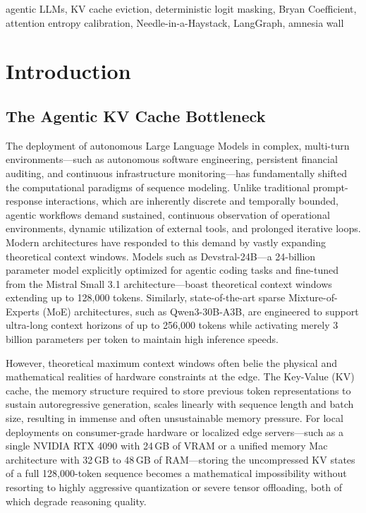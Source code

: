 \documentclass[11pt,a4paper]{article}
\begin{document}
\begin{keywords}
agentic LLMs, KV cache eviction, deterministic logit masking, Bryan Coefficient, attention entropy calibration, Needle-in-a-Haystack, LangGraph, amnesia wall
\end{keywords}

\section{Introduction}

\subsection{The Agentic KV Cache Bottleneck}
The deployment of autonomous Large Language Models in complex, multi-turn environments---such as autonomous software engineering, persistent financial auditing, and continuous infrastructure monitoring---has fundamentally shifted the computational paradigms of sequence modeling.\cite{1} Unlike traditional prompt-response interactions, which are inherently discrete and temporally bounded, agentic workflows demand sustained, continuous observation of operational environments, dynamic utilization of external tools, and prolonged iterative loops. Modern architectures have responded to this demand by vastly expanding theoretical context windows. Models such as Devstral-24B---a 24-billion parameter model explicitly optimized for agentic coding tasks and fine-tuned from the Mistral Small 3.1 architecture---boast theoretical context windows extending up to 128,000 tokens.\cite{2} Similarly, state-of-the-art sparse Mixture-of-Experts (MoE) architectures, such as Qwen3-30B-A3B, are engineered to support ultra-long context horizons of up to 256,000 tokens while activating merely 3 billion parameters per token to maintain high inference speeds.\cite{3}

However, theoretical maximum context windows often belie the physical and mathematical realities of hardware constraints at the edge. The Key-Value (KV) cache, the memory structure required to store previous token representations to sustain autoregressive generation, scales linearly with sequence length and batch size, resulting in immense and often unsustainable memory pressure.\cite{4} For local deployments on consumer-grade hardware or localized edge servers---such as a single NVIDIA RTX 4090 with 24\,GB of VRAM or a unified memory Mac architecture with 32\,GB to 48\,GB of RAM---storing the uncompressed KV states of a full 128,000-token sequence becomes a mathematical impossibility without resorting to highly aggressive quantization or severe tensor offloading, both of which degrade reasoning quality.
\end{document}

